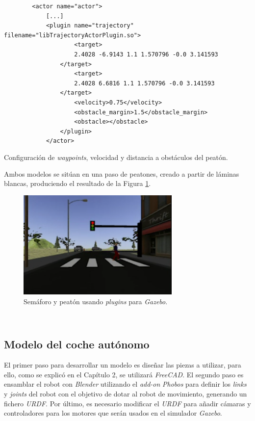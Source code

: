 \begin{code}[h]
	\begin{lstlisting}
		<actor name="actor">
			[...]
			<plugin name="trajectory" filename="libTrajectoryActorPlugin.so">
					<target>
					2.4028 -6.9143 1.1 1.570796 -0.0 3.141593
				</target>
					<target>
					2.4028 6.6816 1.1 1.570796 -0.0 3.141593
				</target>
					<velocity>0.75</velocity>
					<obstacle_margin>1.5</obstacle_margin>
					<obstacle></obstacle>
				</plugin>
			</actor>
	\end{lstlisting}
	\caption[Configuración de \textit{waypoints}, velocidad y distancia a obstáculos del peatón.]{Configuración de \textit{waypoints}, velocidad y distancia a obstáculos del
		peatón.}
	\label{cod:pedestrianconfiguration}
\end{code}

Ambos modelos se sitúan en una paso de peatones, creado a partir de láminas blancas, produciendo el resultado de la Figura \ref{fig:trafficlightpedestrian}.\\

\begin{figure} [h!]
	\begin{center}
		\includegraphics[width=8cm]{figs/trafficlightpedestrian}
	\end{center}
	\caption{Semáforo y peatón usando \textit{plugins} para \textit{Gazebo}.}
	\label{fig:trafficlightpedestrian}
\end{figure}\

\subsection{Modelo del coche autónomo}
\label{subsection:vehiclemodel}
El primer paso para desarrollar un modelo es diseñar las piezas a utilizar, para ello, como se explicó en el Capítulo 2, se utilizará \textit{FreeCAD}. El segundo paso es
ensamblar el robot con \textit{Blender} utilizando el \textit{add-on} \textit{Phobos} para definir los \textit{links} y \textit{joints} del robot con el objetivo de dotar al robot
de movimiento, generando un fichero \textit{URDF}. Por último, es necesario modificar el \textit{URDF} para añadir cámaras y controladores para los motores que serán usados en el
simulador \textit{Gazebo}.\\

